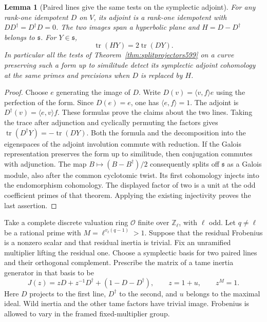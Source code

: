 \documentclass[a4paper,11pt]{article}
\newtheorem{lemma}[proposition]{Lemma}
\theoremstyle{definition}
\theoremstyle{remark}
\newcommand{\ZZ}{\mathbb Z}\newcommand{\ord}{\operatorname{ord}}
\numberwithin{equation}{section}
\begin{document}
\begin{lemma}[Paired lines give the same tests on the symplectic adjoint]
\leavevmode\label{lem:pairedlines651}
For any rank-one idempotent \(D\) on \(V\), its adjoint is a
rank-one idempotent with \(DD^\dagger=D^\dagger D=0\). The two
images span a hyperbolic plane and \(H=D-D^\dagger\) belongs
to \(\mathfrak s\). For \(Y\in\mathfrak s\),
\[
                 \operatorname{tr}(HY)=2\operatorname{tr}(DY).
\]
In particular all the tests of Theorem~\ref{thm:splitprojectors599}
on a curve preserving such a form up to similitude detect its
symplectic adjoint cohomology at the same primes and precisions
when \(D\) is replaced by \(H\).
\end{lemma}
\begin{proof}
Choose \(e\) generating the image of \(D\). Write
\(D(v)=\langle v,f\rangle e\) using the perfection of the form.
Since \(D(e)=e\), one has \(\langle e,f\rangle=1\).
The adjoint is \(D^\dagger(v)=\langle e,v\rangle f\).
These formulas prove the claims about the two lines. Taking the
trace after adjunction and cyclically permuting the factors
gives \(\operatorname{tr}(D^\dagger Y)=-\operatorname{tr}(DY)\).
Both the formula and the decomposition into the eigenspaces
of the adjoint involution commute with reduction. If the
Galois representation preserves the form up to similitude,
then conjugation commutes with adjunction. The map
\(B\mapsto(B-B^\dagger)/2\) consequently splits off
\(\mathfrak s\) as a Galois module, also after the common
cyclotomic twist. Its first cohomology injects into the
endomorphism cohomology. The displayed factor of two is a unit
at the odd coefficient primes of that theorem. Applying the
existing injectivity proves the last assertion.
\end{proof}

Take a complete discrete valuation ring \(\mathcal O\) finite
over \(\ZZ_\ell\), with \(\ell\) odd. Let \(q\ne\ell\) be a
rational prime with \(M=\ell^{v_\ell(q-1)}>1\). Suppose that the
residual Frobenius is a nonzero scalar and that residual inertia
is trivial. Fix an unramified multiplier lifting the residual
one. Choose a symplectic basis for two paired lines and their
orthogonal complement. Prescribe the matrix of a tame inertia
generator in that basis to be
\[
        J(z)=zD+z^{-1}D^\dagger+(1-D-D^\dagger),
              \qquad z=1+u,\qquad z^M=1.
\]
Here \(D\) projects to the first line, \(D^\dagger\) to the
second, and \(u\) belongs to the maximal ideal. Wild inertia
and the other tame factors have trivial image. Frobenius is
allowed to vary in the framed fixed-multiplier group.
\end{document}
